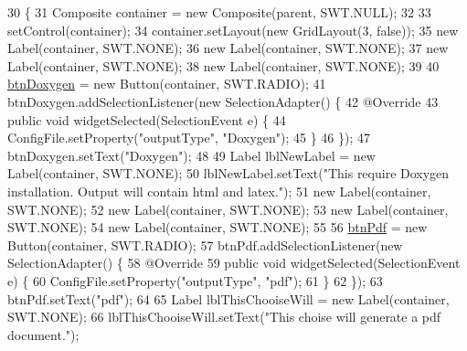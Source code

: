 \begin{DoxyCode}
30                                                 \{
31         Composite container = \textcolor{keyword}{new} Composite(parent, SWT.NULL);
32 
33         setControl(container);
34         container.setLayout(\textcolor{keyword}{new} GridLayout(3, \textcolor{keyword}{false}));
35         \textcolor{keyword}{new} Label(container, SWT.NONE);
36         \textcolor{keyword}{new} Label(container, SWT.NONE);
37         \textcolor{keyword}{new} Label(container, SWT.NONE);
38         \textcolor{keyword}{new} Label(container, SWT.NONE);
39         
40         \hyperlink{classit_1_1isislab_1_1masonhelperdocumentation_1_1mason_1_1wizards_1_1_a1___choose_output_ac2ea8ed088a188d85870e9afb90b8f88}{btnDoxygen} = \textcolor{keyword}{new} Button(container, SWT.RADIO);
41         btnDoxygen.addSelectionListener(\textcolor{keyword}{new} SelectionAdapter() \{
42             @Override
43             \textcolor{keyword}{public} \textcolor{keywordtype}{void} widgetSelected(SelectionEvent e) \{
44                 ConfigFile.setProperty(\textcolor{stringliteral}{"outputType"}, \textcolor{stringliteral}{"Doxygen"});
45             \}
46         \});
47         btnDoxygen.setText(\textcolor{stringliteral}{"Doxygen"});
48         
49         Label lblNewLabel = \textcolor{keyword}{new} Label(container, SWT.NONE);
50         lblNewLabel.setText(\textcolor{stringliteral}{"This require Doxygen installation. Output will contain html and latex."});
51         \textcolor{keyword}{new} Label(container, SWT.NONE);
52         \textcolor{keyword}{new} Label(container, SWT.NONE);
53         \textcolor{keyword}{new} Label(container, SWT.NONE);
54         \textcolor{keyword}{new} Label(container, SWT.NONE);
55         
56         \hyperlink{classit_1_1isislab_1_1masonhelperdocumentation_1_1mason_1_1wizards_1_1_a1___choose_output_ae7d5e743ab4af65fec8563ca08ed561c}{btnPdf} = \textcolor{keyword}{new} Button(container, SWT.RADIO);
57         btnPdf.addSelectionListener(\textcolor{keyword}{new} SelectionAdapter() \{
58             @Override
59             \textcolor{keyword}{public} \textcolor{keywordtype}{void} widgetSelected(SelectionEvent e) \{
60                 ConfigFile.setProperty(\textcolor{stringliteral}{"outputType"}, \textcolor{stringliteral}{"pdf"});
61             \}
62         \});
63         btnPdf.setText(\textcolor{stringliteral}{"pdf"});
64         
65         Label lblThisChooiseWill = \textcolor{keyword}{new} Label(container, SWT.NONE);
66         lblThisChooiseWill.setText(\textcolor{stringliteral}{"This choise will generate a pdf document."});

\end{DoxyCode}
